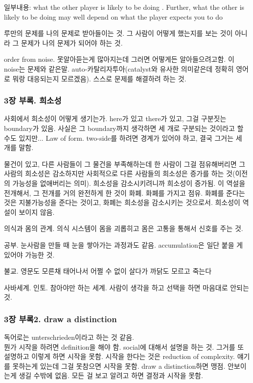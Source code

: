 \documentclass[11pt, a4paper]{article}
\begin{document}
일부내용: what the other player is likely to be doing . Further, what the other is likely to be doing may well depend on what the player expects you to do

루만의 문제를 나의 문제로 받아들이는 것. 그 사람이 어떻게 했는지를 보는 것이 아니라 그 문제가 나의 문제가 되어야 하는 것.

order from noise. 못알아듣는게 많아지는데 그러면 어떻게든 알아들으려고함. 이 noise는 문제와 같은말. auto-카탈리자투아(catalyst와 유사한 의미같은데 정확히 영어로 뭐랑 대응되는지 모르겠음). 스스로 문제를 해결하려 하는 것.

\subsubsection{3장 부록. 희소성}
사회에서 희소성이 어떻게 생기는가. here가 있고 there가 있고, 그걸 구분짓는 boundary가 있음. 사실은 그 boundary까지 생각하면 세 개로 구분되는 것이라고 할 수도 있지만... Law of form. two-side를 하려면 경계가 있어야 하고, 결국 그거는 세 개를 말함.

물건이 있고, 다른 사람들이 그 물건을 부족해하는데 한 사람이 그걸 점유해버리면 그 사람의 희소성은 감소하지만 사회적으로 다른 사람들의 희소성은 증가를 하는 것(이전의 가능성을 없애버리는 의미). 희소성을 감소시키려니까 희소성이 증가됨. 이 역설을 전개해서, 그 전개를 거의 완전하게 한 것이 화폐. 화폐를 가지고 점유. 화폐를 준다는 것은 지불가능성을 준다는 것이고, 화폐는 희소성을 감소시키는 것으로서. 희소성이 역설이 보이지 않음.

의식과 몸의 관계. 의식 시스템이 몸을 괴롭히고 몸은 고통을 통해서 신호를 주는 것.

공부. 눈사람을 만들 때 눈을 쌓아가는 과정과도 같음. accumulation은 일단 붙을 게 있어야 가능한 것.

불교. 영문도 모른채 태어나서 어쩔 수 없이 살다가 까닭도 모르고 죽는다

사바세계. 인토. 참아야만 하는 세계. 사람이 생각을 하고 선택을 하면 마음대로 안되는 것. 

\subsubsection{3장 부록2. draw a distinction}
독어로는 unterschrieden이라고 하는 것 같음.\\
뭔가 시작을 하려면 definition을 해야 함. social에 대해서 설명을 하는 것. 그거를 또 설명하고 이렇게 하면 시작을 못함. 시작을 한다는 것은 reduction of complexity. 얘기를 못하는게 있는데 그걸 못참으면 시작을 못함. draw a distinction하면 맹점. 안보이는게 생길 수밖에 없음. 모든 걸 보고 알려고 하면 결정과 시작을 못함.
\end{document}
